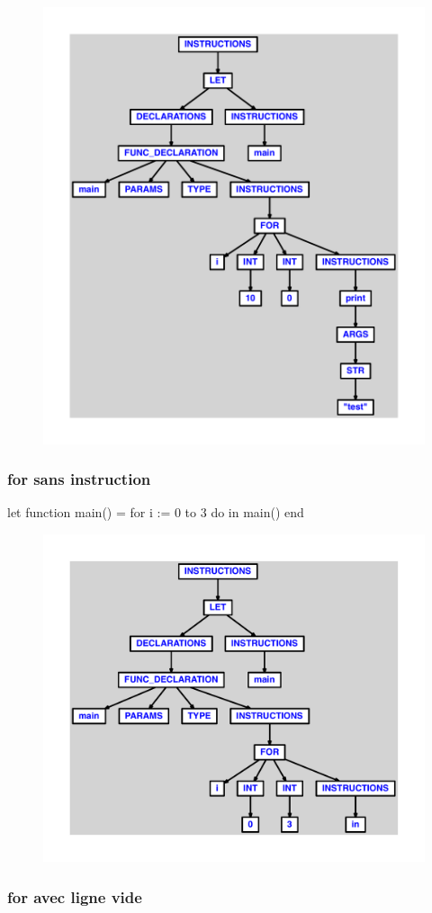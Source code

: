 \documentclass{article}
\begin{document}
\begin{figure}[H]\centering\includegraphics[max width=\textwidth]{ast/ast_197.pdf}\end{figure}\subsubsection{for sans instruction}
\begin{verbatimtab}
let
	function main() =
		for i := 0 to 3 do
in main() end
\end{verbatimtab}
\begin{figure}[H]\centering\includegraphics[max width=\textwidth]{ast/ast_198.pdf}\end{figure}\subsubsection{for avec ligne vide}
\end{document}
